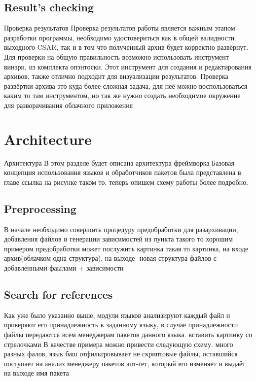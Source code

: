 \subsection*{Result's checking}
Проверка результатов
Проверка результатов работы является важным этапом разработки программы, необходимо удостовериться как в общей валидности выходного CSAR, так и в том что полученный архив будет корректно развёрнут. 
Для проверки на общую правильность возможно использовать инструмент винэри, из комплекта опэнтоски. Этот инструмент для создания и редактирования архивов, также отлично подходит для визуализации результатов.
Проверка развёртки архива это куда более сложная задача, для неё можно воспользоваться каким то там инструментом, но так же нужно создать необходимое окружение для разворачивания облачного приложения
 



\fi
\section{Architecture}
Архитектура
В этом разделе будет описана архитектура фреймворка
Базовая концепция использования языков и обработчиков пакетов была представлена в главе ссылка на рисунке таком то, теперь опишем схему работы более подробно. 


\fi
\subsection*{Preprocessing}
В начале необходимо совершить процедуру предобработки для разархивации, добавления файлов и генерации зависимостей из пункта такого то
хорошим примером предобработки может послужить картинка такая то
картинка, на входе архив(облачком одна структура), на выходе -новая структура файлов с добавленными фаылами + зависимости

\fi
\subsection*{Search for references}
Как уже было указанно выше, модули языков анализируют каждый файл и проверяют его принадлежность к заданному языку, в случае принадлежности файлы передаются всем менеджерам пакетов данного языка. 
вставить картинку со стрелочками
В качестве примера можно привести следующую схему.
много разных фалов, язык баш отфильтровывает не скриптовые файлы, оставшийся поступает на анализ менеджеру пакетов апт-гет, который его изменяет и выдаёт на выходе имя пакета


